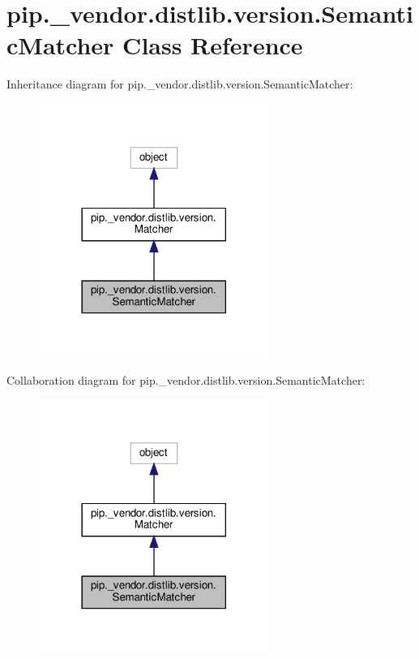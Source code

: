 \hypertarget{classpip_1_1__vendor_1_1distlib_1_1version_1_1SemanticMatcher}{}\section{pip.\+\_\+vendor.\+distlib.\+version.\+Semantic\+Matcher Class Reference}
\label{classpip_1_1__vendor_1_1distlib_1_1version_1_1SemanticMatcher}


Inheritance diagram for pip.\+\_\+vendor.\+distlib.\+version.\+Semantic\+Matcher\+:
\nopagebreak
\begin{figure}[H]
\begin{center}
\leavevmode
\includegraphics[width=213pt]{classpip_1_1__vendor_1_1distlib_1_1version_1_1SemanticMatcher__inherit__graph}
\end{center}
\end{figure}


Collaboration diagram for pip.\+\_\+vendor.\+distlib.\+version.\+Semantic\+Matcher\+:
\nopagebreak
\begin{figure}[H]
\begin{center}
\leavevmode
\includegraphics[width=213pt]{classpip_1_1__vendor_1_1distlib_1_1version_1_1SemanticMatcher__coll__graph}
\end{center}
\end{figure}
